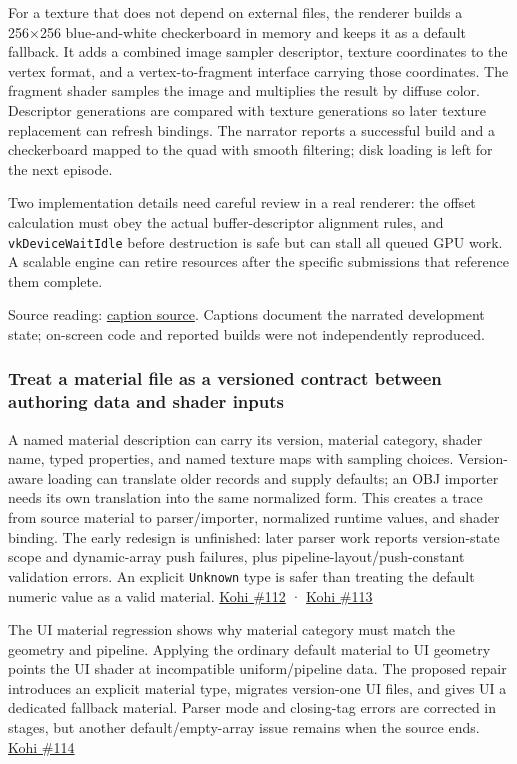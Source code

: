For a texture that does not depend on external files, the renderer builds a 256×256 blue-and-white checkerboard in memory and keeps it as a default fallback. It adds a combined image sampler descriptor, texture coordinates to the vertex format, and a vertex-to-fragment interface carrying those coordinates. The fragment shader samples the image and multiplies the result by diffuse color. Descriptor generations are compared with texture generations so later texture replacement can refresh bindings. The narrator reports a successful build and a checkerboard mapped to the quad with smooth filtering; disk loading is left for the next episode.

Two implementation details need careful review in a real renderer: the offset calculation must obey the actual buffer-descriptor alignment rules, and \texttt{vkDeviceWaitIdle} before destruction is safe but can stall all queued GPU work. A scalable engine can retire resources after the specific submissions that reference them complete.

Source reading: \href{https://www.youtube.com/watch?v=n7qS96720yI}{caption source}. Captions document the narrated development state; on-screen code and reported builds were not independently reproduced.

\subsubsection{Treat a material file as a versioned contract between authoring data and shader inputs}\label{treat-a-material-file-as-a-versioned-contract-between-authoring-data-and-shader-inputs}

A named material description can carry its version, material category, shader name, typed properties, and named texture maps with sampling choices. Version-aware loading can translate older records and supply defaults; an OBJ importer needs its own translation into the same normalized form. This creates a trace from source material to parser/importer, normalized runtime values, and shader binding. The early redesign is unfinished: later parser work reports version-state scope and dynamic-array push failures, plus pipeline-layout/push-constant validation errors. An explicit \texttt{Unknown} type is safer than treating the default numeric value as a valid material. \href{https://www.youtube.com/watch?v=-Ps-749SEs4}{Kohi \#112} · \href{https://www.youtube.com/watch?v=-lHaaoIrdFM}{Kohi \#113}

The UI material regression shows why material category must match the geometry and pipeline. Applying the ordinary default material to UI geometry points the UI shader at incompatible uniform/pipeline data. The proposed repair introduces an explicit material type, migrates version-one UI files, and gives UI a dedicated fallback material. Parser mode and closing-tag errors are corrected in stages, but another default/empty-array issue remains when the source ends. \href{https://www.youtube.com/watch?v=K-EFytY5Pmg}{Kohi \#114}

